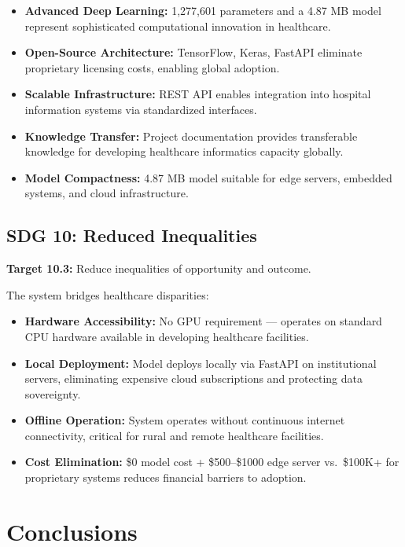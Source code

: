 \documentclass[12pt,a4paper]{article}
\begin{document}
\begin{itemize}
    \item \textbf{Advanced Deep Learning:} 1,277,601 parameters and a 4.87 MB model represent sophisticated computational innovation in healthcare.
    \item \textbf{Open-Source Architecture:} TensorFlow, Keras, FastAPI eliminate proprietary licensing costs, enabling global adoption.
    \item \textbf{Scalable Infrastructure:} REST API enables integration into hospital information systems via standardized interfaces.
    \item \textbf{Knowledge Transfer:} Project documentation provides transferable knowledge for developing healthcare informatics capacity globally.
    \item \textbf{Model Compactness:} 4.87 MB model suitable for edge servers, embedded systems, and cloud infrastructure.
\end{itemize}

\subsection{SDG 10: Reduced Inequalities}

\textbf{Target 10.3:} Reduce inequalities of opportunity and outcome.

The system bridges healthcare disparities:

\begin{itemize}
    \item \textbf{Hardware Accessibility:} No GPU requirement --- operates on standard CPU hardware available in developing healthcare facilities.
    \item \textbf{Local Deployment:} Model deploys locally via FastAPI on institutional servers, eliminating expensive cloud subscriptions and protecting data sovereignty.
    \item \textbf{Offline Operation:} System operates without continuous internet connectivity, critical for rural and remote healthcare facilities.
    \item \textbf{Cost Elimination:} \$0 model cost + \$500--\$1000 edge server vs.\ \$100K+ for proprietary systems reduces financial barriers to adoption.
\end{itemize}

\newpage

\section{Conclusions}
\end{document}
